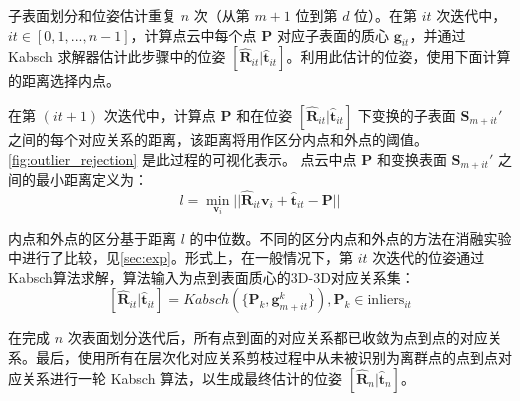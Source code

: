 子表面划分和位姿估计重复 $n$ 次（从第 $m + 1$ 位到第 $d$ 位）。在第 $it$ 次迭代中，$it \in [0,1,...,n-1]$，计算点云中每个点 $\bm{P}$ 对应子表面的质心 $\bm{g}_{it}$，并通过 Kabsch 求解器估计此步骤中的位姿 $[\hat{\bm{R}}_{it}|\hat{\bm{t}}_{it}]$。利用此估计的位姿，使用下面计算的距离选择内点。

在第 $(it+1)$ 次迭代中，计算点 $\bm{P}$ 和在位姿 $[\hat{\bm{R}}_{it}|\hat{\bm{t}}_{it}]$ 下变换的子表面 $\bm{S}_{m+it}'$ 之间的每个对应关系的距离，该距离将用作区分内点和外点的阈值。\autoref{fig:outlier_rejection} 是此过程的可视化表示。
点云中点 $\bm{P}$ 和变换表面 $\bm{S}_{m+it}'$ 之间的最小距离定义为：
\begin{equation}
\label{eq:l}
l = \min\limits_{\bm{v}_i} ||\hat{\bm{R}}_{it} \bm{v}_{i} + \hat{\bm{t}}_{it}-\bm{P}||
\end{equation}

内点和外点的区分基于距离 $l$ 的中位数。不同的区分内点和外点的方法在消融实验中进行了比较，见\autoref{sec:exp}。形式上，在一般情况下，第 $it$ 次迭代的位姿通过 Kabsch算法求解，算法输入为点到表面质心的3D-3D对应关系集：
\begin{equation}
    \label{eq:posekabsch}
    [\hat{\bm{R}}_{it}|\hat{\bm{t}}_{it}] = {Kabsch}(\{\bm{P}_{k}, \bm{g}_{m+it}^{k}\}), {\bm{P}_{k}\in \text{inliers}_{it}}
\end{equation}

在完成 $n$ 次表面划分迭代后，所有点到面的对应关系都已收敛为点到点的对应关系。最后，使用所有在层次化对应关系剪枝过程中从未被识别为离群点的点到点对应关系进行一轮 Kabsch 算法，以生成最终估计的位姿 $[\hat{\bm{R}}_{n}|\hat{\bm{t}}_{n}]$。
